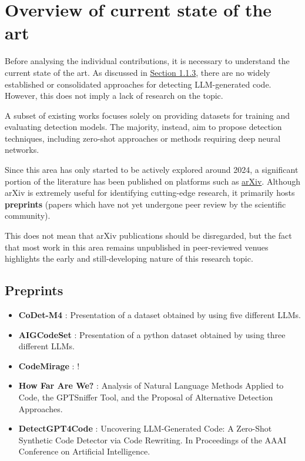 \clearpage

\chapter{Overview of current state of the art}

Before analysing the individual contributions, 
it is necessary to understand the current state 
of the art. As discussed in
\hyperref[sec:Challenges in LLM-Generated Code Detection]{Section 1.1.3}, 
there are no widely established or consolidated 
approaches for detecting LLM-generated code. However, 
this does not imply a lack of research on the topic. 

A subset of existing works focuses solely on 
providing datasets for training and evaluating 
detection models. The majority, instead, aim to 
propose detection techniques, including zero-shot 
approaches or methods requiring deep neural networks.

Since this area has only started to be actively 
explored around 2024, a significant portion of the 
literature has been published on platforms such as 
\href{https://arxiv.org/abs/2301.11305}{arXiv}. 
Although arXiv is extremely useful for 
identifying cutting-edge research, it primarily hosts 
\textbf{preprints} (papers which have not yet undergone 
peer review by the scientific community).

This does not mean that arXiv publications should 
be disregarded, but the fact that most work in this 
area remains unpublished in peer-reviewed venues 
highlights the early and still-developing nature 
of this research topic.

\section*{Preprints}
\begin{itemize}
  \item \textbf{CoDet-M4} \cite{orel2025codet}: Presentation of a dataset 
  obtained by using five different LLMs.

  \item \textbf{AIGCodeSet} \cite{demirok2024aigcodeset}: Presentation of a python dataset 
  obtained by using three different LLMs.

  \item \textbf{CodeMirage} \cite{guo2025codemirage}: !

  \item \textbf{How Far Are We?} \cite{suh2024empirical}: Analysis of Natural Language Methods 
  Applied to Code, the GPTSniffer Tool, and the Proposal of Alternative Detection Approaches.
  
  \item \textbf{DetectGPT4Code} \cite{yang2023zero}: Uncovering LLM-Generated Code: A Zero-Shot 
  Synthetic Code Detector via Code Rewriting. In Proceedings of the AAAI 
  Conference on Artificial Intelligence.

\end{itemize}



